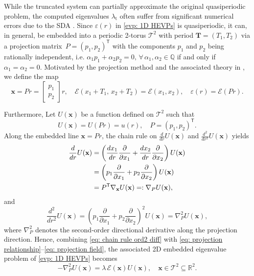 \documentclass[11pt]{article}
\def\x{\mathbf{x}}
\numberwithin{equation}{section}
\begin{document}
While the truncated system can partially approximate the original quasiperiodic problem, the computed eigenvalues $\lambda_{\mathrm{t}}$ often suffer from significant numerical errors due to the SDA \cite{davenport1946simultaneous, jiang2025approximation}. Since $\varepsilon(r)$ in \eqref{evp: 1D HEVPs} is quasiperiodic, it can, in general, be embedded into a periodic 2-torus $\mathcal{T}^2$ with period $\mathbf{T} = (T_1, T_2)$ via a projection matrix $\, P = \left(p_1,  p_2\right)^\mathsf{T}$  with the components $p_1$ and $p_2$ being rationally independent, i.e. $\alpha_1p_1 + \alpha_2p_2 = 0, \, \forall \,\alpha_1, \alpha_2 \in \mathbb{Q}$ if and only if $\alpha_1 = \alpha_2 = 0.$ Motivated by the projection method and the associated theory in \cite{jiang2014numerical, jiang2024numerical},
we define the map
\begin{equation} \label{eq: projection relationship}
\mathbf{x} = P r =
\begin{bmatrix}
p_1 \\ p_2
\end{bmatrix} r,
\quad
\mathcal{E}(x_1+T_1, \, x_2 + T_2) = \mathcal{E}(x_1, x_2),
\quad
\varepsilon(r) = \mathcal{E}(P r).
\end{equation}

Furthermore, Let $U(\x)$ be a function defined on $\mathcal{T}^2$ such that
\begin{equation} \label{eq: projection field}
U(\mathbf{x}) = U(Pr) = u(r) , \quad P = \left(p_1,  p_2\right)^\mathsf{T} .
\end{equation}
Along the embedded line $\mathbf{x}=Pr$, the chain rule on $\frac{d}{dr} U(\mathbf{x})$ and $ \frac{d^2}{dr^2} U(\mathbf{x})$ yields
\begin{align} \label{eq: chain rule difference}
\frac{d}{dr} U(\mathbf{x})
&=
\left(
\frac{d x_1}{d r} \frac{\partial}{\partial x_1}
+
\frac{d x_2}{d r} \frac{\partial}{\partial x_2}
\right) U(\mathbf{x}) \notag \\
&=
\left(
p_1 \frac{\partial}{\partial x_1}
+
p_2 \frac{\partial}{\partial x_2}
\right) U(\mathbf{x}) \notag \\
&=
P^\mathsf{T} \nabla_{\mathbf{x}} U(\mathbf{x})
=: \nabla_P U(\mathbf{x}),
\end{align}
and
\begin{equation} \label{eq: chain rule ord2 diff}
\frac{d^2}{dr^2} U(\mathbf{x})
=
\left( p_1 \frac{\partial}{\partial x_1}
+
p_2 \frac{\partial}{\partial x_2}\right)^2 U(\mathbf{x})
=
\nabla_P^2 U(\mathbf{x}),
\end{equation}
where $\nabla_P^2$ denotes the second-order directional derivative along the projection direction. Hence, combining \eqref{eq: chain rule ord2 diff} with \eqref{eq: projection relationship}--\eqref{eq: projection field}, the associated 2D embedded eigenvalue problem of \eqref{evp: 1D HEVPs} becomes
\begin{equation} \label{evp: 1Dto2D continous projection}
- \nabla_P^2 U(\mathbf{x})
=
\lambda \, \mathcal{E}(\mathbf{x}) U(\mathbf{x}),
\quad
\mathbf{x} \in \mathcal{T}^2 \subseteq \mathbb{R}^2.
\end{equation}
\end{document}
